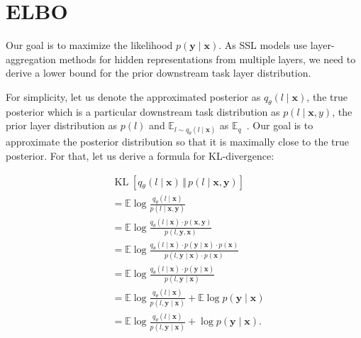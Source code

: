 \appendix
\section{ELBO}
\label{appendix:elbo_deriviation}

\newcommand{\Expec}{\mathbb{E}_{q}}

Our goal is to maximize the likelihood $p(\boldsymbol{y} \mid \boldsymbol{x})$. As SSL models use layer-aggregation methods for hidden representations from multiple layers, we need to derive a lower bound for the prior downstream task layer distribution.

For simplicity, let us denote the approximated posterior as $q_\theta(l\mid \boldsymbol{x})$, the true posterior which is a particular downstream task distribution as $p(l\mid \boldsymbol{x}, y)$, the prior layer distribution as  $p(l)$ and $\mathbb{E}_{l \sim q_\theta(l \mid \boldsymbol{x})}$ as $\Expec$~. Our goal is to approximate the posterior distribution so that it is maximally close to the true posterior. For that, let us derive a formula for KL-divergence:

\begin{equation*}
\begin{aligned}
    & \operatorname{KL}\left[ q_\theta(l \mid \boldsymbol{x}) \, \Vert \, p(l \mid \boldsymbol{x}, \boldsymbol{y})\right] \\
    &= \mathbb{E} \log \frac{q_\theta(l \mid \boldsymbol{x})}{p(l \mid \boldsymbol{x}, \boldsymbol{y})} \\
    &= \mathbb{E} \log \frac{q_\theta(l \mid \boldsymbol{x}) \cdot p(\boldsymbol{x}, \boldsymbol{y})}{p(l, \boldsymbol{y}, \boldsymbol{x})} \\
    &= \mathbb{E} \log \frac{q_\theta(l \mid \boldsymbol{x}) \cdot p(\boldsymbol{y} \mid \boldsymbol{x}) \cdot p(\boldsymbol{x})}{p(l, \boldsymbol{y} \mid \boldsymbol{x}) \cdot p(\boldsymbol{x})} \\
    &= \mathbb{E} \log \frac{q_\theta(l \mid \boldsymbol{x}) \cdot p(\boldsymbol{y} \mid \boldsymbol{x})}{p(l, \boldsymbol{y} \mid \boldsymbol{x})} \\
    &= \mathbb{E} \log \frac{q_\theta(l \mid \boldsymbol{x})}{p(l, \boldsymbol{y} \mid \boldsymbol{x})} + \mathbb{E} \log p(\boldsymbol{y} \mid \boldsymbol{x}) \\
    &= \mathbb{E} \log \frac{q_\theta(l \mid \boldsymbol{x})}{p(l, \boldsymbol{y} \mid \boldsymbol{x})} + \log p(\boldsymbol{y} \mid \boldsymbol{x}).
\end{aligned}
\end{equation*}


